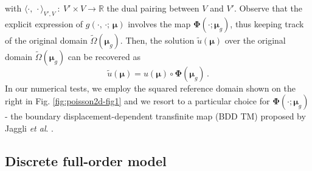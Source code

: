\documentclass{elsarticle}
\numberwithin{equation}{section}
\theoremstyle{theorem}
\theoremstyle{definition}
\theoremstyle{remark}
\theoremstyle{proposition}
\numberwithin{figure}{section}
\newcommand{\wt}[1]{\widetilde{#1}}
\newcommand{\bg}[1]{\boldsymbol{#1}}
\begin{document}
		with $\langle \cdot, \, \cdot \rangle_{V',V} ~ : ~ V' \times V \rightarrow \mathbb{R}$ the dual pairing between $V$ and $V'$. Observe that the explicit expression of $g(\cdot, \, \cdot; \, \bg{\mu})$ involves the map $\bg{\Phi}(\cdot; \bg{\mu}_g)$, thus keeping track of the original domain $\wt{\Omega}(\bg{\mu}_g)$. Then, the solution $\wt{u}(\bg{\mu})$ over the original domain $\wt{\Omega}(\bg{\mu}_g)$ can be recovered as
		\begin{equation*}
			\wt{u}(\bg{\mu}) = u(\bg{\mu}) \circ \bg{\Phi}(\bg{\mu}_g) \, .
		\end{equation*}
		In our numerical tests, we employ the squared reference domain shown on the right in Fig. \ref{fig:poisson2d-fig1} and we resort to a particular choice for $\bg{\Phi}(\cdot; \bg{\mu}_g)$ - the boundary displacement-dependent transfinite map (BDD TM) proposed by Jaggli \emph{et al}. \cite{JIR14}.
		
		
	
	\subsection{Discrete full-order model}
	\label{section:Discrete full-order model}
	
\end{document}
